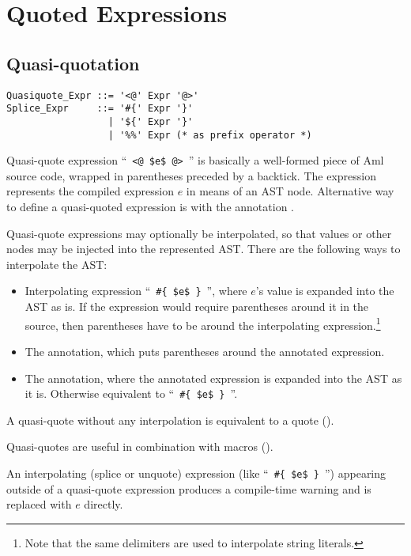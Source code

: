 \section{Quoted Expressions}
\label{sec:syntactic-forms}






\subsection{Quasi-quotation}
\label{sec:quasi-quotation}

\grammar\begin{lstlisting}[mathescape=false]
Quasiquote_Expr ::= '<@' Expr '@>'
Splice_Expr     ::= '#{' Expr '}'
                  | '${' Expr '}'
                  | '%%' Expr (* as prefix operator *)
\end{lstlisting}

Quasi-quote expression ``~\lstinline!<@ $e$ @>!~'' is basically a well-formed piece of Aml source code, wrapped in parentheses preceded by a backtick. The expression represents the compiled expression $e$ in means of an AST node. Alternative way to define a quasi-quoted expression is with the annotation .

Quasi-quote expressions may optionally be interpolated, so that values or other nodes may be injected into the represented AST. There are the following ways to interpolate the AST:
\begin{itemize}
  \item Interpolating expression ``~\lstinline!#{ $e$ }!~'', where $e$'s value is expanded into the AST as is. If the expression would require parentheses around it in the source, then parentheses have to be around the interpolating expression.\footnote{Note that the same delimiters are used to interpolate string literals.}
  \item The  annotation, which puts parentheses around the annotated expression.
  \item The  annotation, where the annotated expression is expanded into the AST as it is. Otherwise equivalent to ``~\lstinline!#{ $e$ }!~''.
\end{itemize}

A quasi-quote without any interpolation is equivalent to a quote (). 

Quasi-quotes are useful in combination with macros (). 

An interpolating (splice or unquote) expression (like ``~\lstinline!#{ $e$ }!~'') appearing outside of a quasi-quote expression produces a compile-time warning and is replaced with $e$ directly. 





